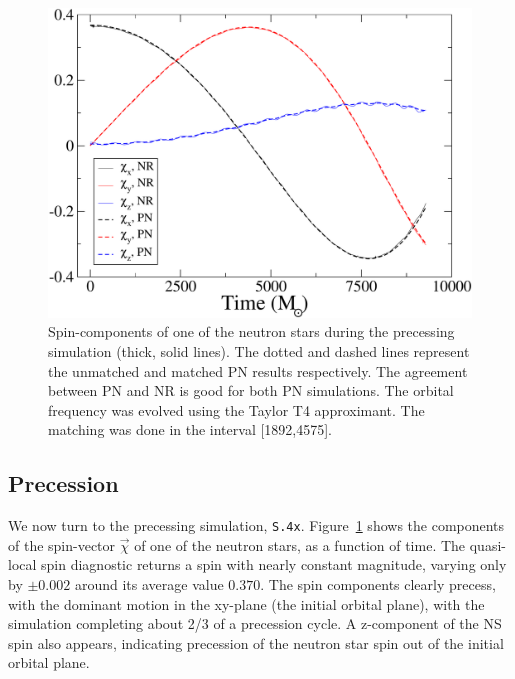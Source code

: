 {%
\begin{figure}
\includegraphics[width=0.95\columnwidth]{chap2/SpinMatchedUnmatched}
  \caption[Spin-components of one of the neutron stars during the precessing simulation.]{\label{fig:FullPrec} Spin-components of one of the neutron
    stars during the precessing simulation (thick, solid lines).  The
    dotted and dashed lines represent the unmatched and matched PN
    results respectively. The agreement between PN and NR is good for
    both PN simulations. The orbital frequency was evolved using the
    Taylor T4 approximant. The matching was done in the interval
    [1892,4575].}
\end{figure}

\subsection{Precession}


We now turn to the precessing simulation, {\tt S.4x}.
Figure~\ref{fig:FullPrec} shows the components of the spin-vector
$\vec\chi$ of one of the neutron stars, as a function of time.  The
quasi-local spin diagnostic returns a spin with nearly constant
magnitude, varying only by $\pm 0.002$ around its average value
$0.370$.  The spin components clearly precess, with the dominant
motion in the xy-plane (the initial orbital plane), with the
simulation completing about 2/3 of a precession cycle.  A z-component
of the NS spin also appears, indicating precession of the neutron star
spin out of the initial orbital plane.

}
